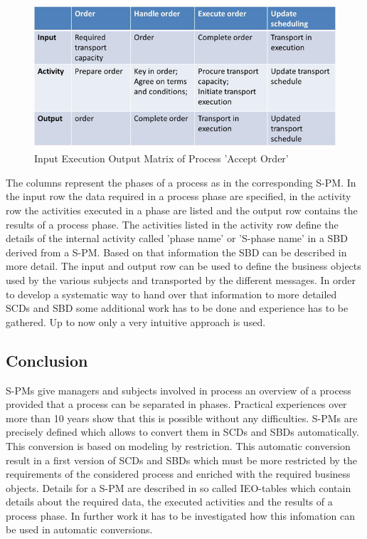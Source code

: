 \begin{figure}[hbtp]
	\includegraphics[scale=0.5]{Figures/Chapter5/Subject-Phase/Inpurt-Execution-Output.png}
	\caption{Input Execution Output Matrix of Process 'Accept Order'}
	\label{fig:Inpurt-Execution-Output}
\end{figure}

The columns represent the phases of a process as in the corresponding  S-PM. In the input row the data required in a process phase are specified, in the activity row the activities executed in a phase are listed and the output row contains the results of a process phase. 
The activities listed in the activity row define the details of the internal activity called 'phase name' or 'S-phase name' in a SBD derived from a S-PM. Based on that information the SBD can be described in more detail.
The input and output row can be used to define the business objects used by the various subjects and transported by the different messages.
In order to develop a systematic way to hand over that information to more detailed SCDs and SBD some additional work has to be done and experience has to be gathered. Up to now only a very intuitive approach is used.

\subsection{Conclusion}
S-PMs give managers and subjects involved in process an overview of a process provided that a process can be separated in phases. Practical experiences over more than 10 years show that this is possible without any difficulties. S-PMs are precisely defined which allows to convert them in SCDs and SBDs automatically. This conversion is based on modeling by restriction. This automatic conversion result in a first version of SCDs and SBDs which must be more restricted by the requirements of the considered process and enriched with the required business objects. Details for a S-PM are described in so called IEO-tables which contain details about the required data, the executed activities and the results of a process phase. In further work it has to be investigated how this infomation can be used in automatic conversions.

